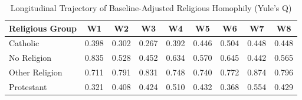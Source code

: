 \begin{table}[ht]
\centering
\caption{Longitudinal Trajectory of Baseline-Adjusted Religious Homophily (Yule's Q)}
\label{tab:yules_q}
\begin{tabular}{lcccccccc}
\hline
Religious Group & W1 & W2 & W3 & W4 & W5 & W6 & W7 & W8 \\
\hline
Catholic & 0.398 & 0.302 & 0.267 & 0.392 & 0.446 & 0.504 & 0.448 & 0.448 \\
No Religion & 0.835 & 0.528 & 0.452 & 0.634 & 0.570 & 0.645 & 0.442 & 0.565 \\
Other Religion & 0.711 & 0.791 & 0.831 & 0.748 & 0.740 & 0.772 & 0.874 & 0.796 \\
Protestant & 0.321 & 0.408 & 0.424 & 0.510 & 0.432 & 0.368 & 0.554 & 0.429 \\
\hline
\end{tabular}
\end{table}


